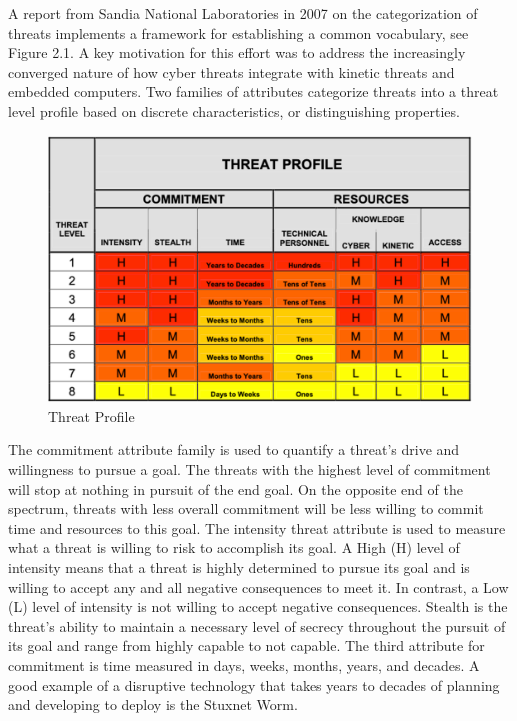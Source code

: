 \documentclass[12pt]{report}
\begin{document}
A report from Sandia National Laboratories in 2007 on the categorization of threats implements a framework for establishing a common vocabulary, see Figure 2.1.  A key motivation for this effort was to address the increasingly converged nature of how cyber threats integrate with kinetic threats and embedded computers.  Two families of attributes categorize threats into a threat level profile based on discrete characteristics, or distinguishing properties.  

\begin{figure}
	\centering
	\includegraphics[width=1\textwidth]{images/Threat_Profile.png}
	\caption{Threat Profile \protect\cite{woodard2007categorizing}}
	\label{fig:APTAttribution-codebase}
\end{figure}

The commitment attribute family is used to quantify a threat’s drive and willingness to pursue a goal.  The threats with the highest level of commitment will stop at nothing in pursuit of the end goal.   On the opposite end of the spectrum, threats with less overall commitment will be less willing to commit time and resources to this goal.  The intensity threat attribute is used to measure what a threat is willing to risk to accomplish its goal.  A High (H) level of intensity means that a threat is highly determined to pursue its goal and is willing to accept any and all negative consequences to meet it.  In contrast, a Low (L) level of intensity is not willing to accept negative consequences.  Stealth is the threat’s ability to maintain a necessary level of secrecy throughout the pursuit of its goal and range from highly capable to not capable.   The third attribute for commitment is time measured in days, weeks, months, years, and decades.  A good example of a disruptive technology that takes years to decades of planning and developing to deploy is the Stuxnet Worm.  
\end{document}
